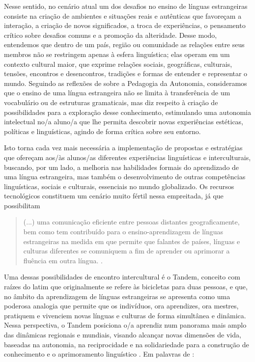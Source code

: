 \documentclass[portuguese]{textolivre}
\begin{document}
Nesse sentido, no cenário atual um dos desafios no ensino de línguas estrangeiras consiste na criação de ambientes e situações reais e autênticas que favoreçam a interação, a criação de novos significados, a troca de experiências, o pensamento crítico sobre desafios comuns e a promoção da alteridade. Desse modo, entendemos que dentro de um país, região ou comunidade as relações entre seus membros não se restringem apenas à esfera linguística; elas operam em um contexto cultural maior, que exprime relações sociais, geográficas, culturais, tensões, encontros e desencontros, tradições e formas de entender e representar o mundo. Seguindo as reflexões de \textcite{freire_pedagogia_2004} sobre a Pedagogia da Autonomia, consideramos que o ensino de uma língua estrangeira não se limita à transferência de um vocabulário ou de estruturas gramaticais, mas diz respeito à criação de possibilidades para a exploração desse conhecimento, estimulando uma autonomia intelectual no/a aluno/a que lhe permita descobrir novas experiências estéticas, políticas e linguísticas, agindo de forma crítica sobre seu entorno. 

Isto torna cada vez mais necessária a implementação de propostas e estratégias que ofereçam aos/às alunos/as diferentes experiências linguísticas e interculturais, buscando, por um lado, a melhoria nas habilidades formais do aprendizado de uma língua estrangeira, mas também o desenvolvimento de outras competências linguísticas, sociais e culturais, essenciais no mundo globalizado. Os recursos tecnológicos constituem um cenário muito fértil nessa empreitada, já que possibilitam 

\begin{quote}
 (...) uma comunicação eficiente entre pessoas distantes geograficamente, bem como tem contribuído para o ensino-aprendizagem de línguas estrangeiras na medida em que permite que falantes de países, línguas e culturas diferentes se comuniquem a fim de aprender ou aprimorar a fluência em outra língua. \cite[p.17]{franco2016}.
\end{quote}

Uma dessas possibilidades de encontro intercultural é o Tandem, conceito com raízes do latim que originalmente se refere às bicicletas para duas pessoas, e que, no âmbito da aprendizagem de línguas estrangeiras se apresenta como uma poderosa analogia que permite que os indivíduos, ora aprendizes, ora mestres, pratiquem e vivenciem novas línguas e culturas de forma simultânea e dinâmica. Nessa perspectiva, o Tandem posiciona o/a aprendiz num panorama mais amplo das dinâmicas regionais e mundiais, visando alcançar novas dimensões de vida, baseadas na autonomia, na reciprocidade e na solidariedade para a construção de conhecimento e o aprimoramento linguístico \cite{vassallo2006foreign}. Em palavras de \textcite[p.84-85]{ramme_tandem:_2015}:
\end{document}
